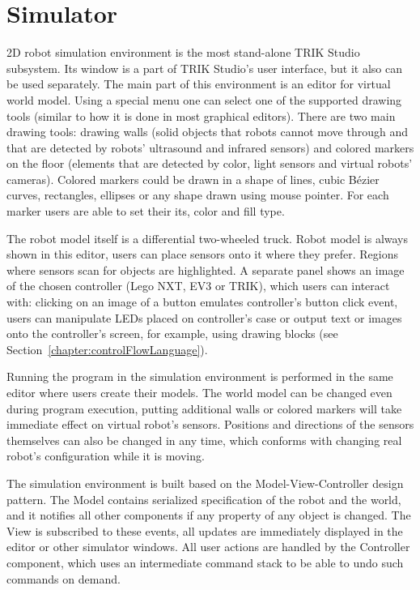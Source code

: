 \documentclass[conference]{IEEEtran}
\begin{document}
\section{Simulator}
\label{chapter:2dModel}

2D robot simulation environment is the most stand-alone TRIK Studio subsystem. Its window is a part of TRIK Studio's user interface, but it also can be used separately. The main part of this environment is an editor for virtual world model. Using a special menu one can select one of the supported drawing tools (similar to how it is done in most graphical editors). There are two main drawing tools: drawing walls (solid objects that robots cannot move through and that are detected by robots' ultrasound and infrared sensors) and colored markers on the floor (elements that are detected by color, light sensors and virtual robots' cameras). Colored markers could be drawn in a shape of lines, cubic Bézier curves, rectangles, ellipses or any shape drawn using mouse pointer. For each marker users are able to set their its, color and fill type. 

The robot model itself is a differential two-wheeled truck. Robot model is always shown in this editor, users can place sensors onto it where they prefer. Regions where sensors scan for objects are highlighted. A separate panel shows an image of the chosen controller (Lego NXT, EV3 or TRIK), which users can interact with: clicking on an image of a button emulates controller's button click event, users can manipulate LEDs placed on controller's case or output text or images onto the controller's screen, for example,  using drawing blocks (see Section~\ref{chapter:controlFlowLanguage}).

Running the program in the simulation environment is performed in the same editor where users create their models. The world model can be changed even during program execution, putting additional walls or colored markers will take immediate effect on virtual robot's sensors. Positions and directions of the sensors themselves can also be changed in any time, which conforms with changing real robot's configuration while it is moving.

The simulation environment is built based on the Model-View-Controller design pattern. The Model contains serialized specification of the robot and the world, and it notifies all other components if any property of any object is changed. The View is subscribed to these events, all updates are immediately displayed in the editor or other simulator windows. All user actions are handled by the Controller component, which uses an intermediate command stack to be able to undo such commands on demand.
\end{document}
